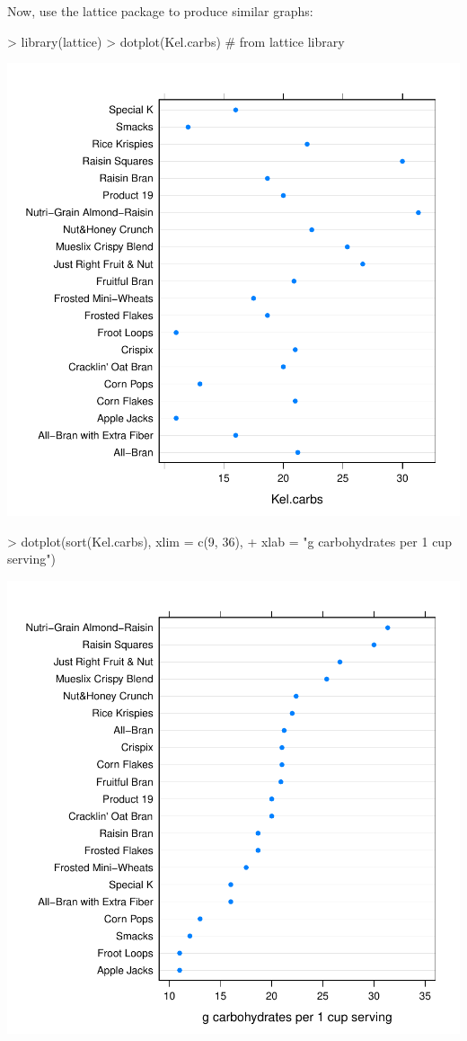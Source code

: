 Now, use the lattice package to produce similar graphs:

\begin{Schunk}
\begin{Sinput}
> library(lattice)
> dotplot(Kel.carbs)  # from lattice library
\end{Sinput}
\end{Schunk}
\includegraphics{lect_chapter5_v2-020}

\begin{Schunk}
\begin{Sinput}
> dotplot(sort(Kel.carbs), xlim = c(9, 36), 
+   xlab = "g carbohydrates per 1 cup serving")
\end{Sinput}
\end{Schunk}
\includegraphics{lect_chapter5_v2-021}


